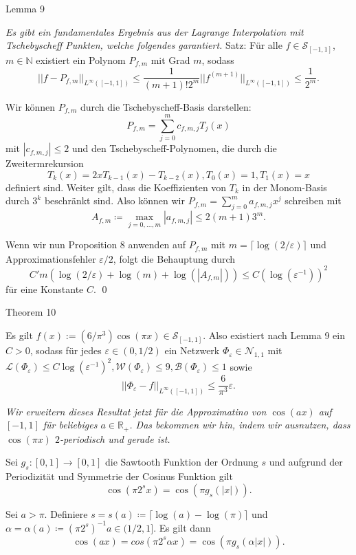 \documentclass[12pt]{article}
\newcommand{\N}{\mathbb{N}} %
\newcommand{\R}{\mathbb{R}} %
\begin{document}
\newpage

{\Large Lemma 9} %

\textit{Es gibt ein fundamentales Ergebnis aus der Lagrange Interpolation mit 
Tschebyscheff Punkten, welche folgendes garantiert.}
Satz: 
Für alle \(f\in \mathcal{S}_{[-1,1]}\), \(m\in\N\) existiert ein Polynom 
\(P_{f,m}\) mit Grad \(m\), sodass 
\[ ||f - P_{f,m}||_{L^\infty ([-1,1])} \leq \frac{1}{(m+1)!2^m} ||f^{(m+1)}||_{L^\infty ([-1,1])} \leq \frac{1}{2^m}. \]

Wir können \(P_{f,m}\) durch die Tschebyscheff-Basis darstellen: 
\[ P_{f,m} = \sum_{j=0}^m c_{f,m,j} T_j(x) \]
mit \(|c_{f,m,j}| \leq 2\) 
und den Tschebyscheff-Polynomen, die durch die Zweitermrekursion 
\[ T_k(x) = 2x T_{k-1}(x) - T_{k-2}(x), T_0(x) = 1, T_1(x) = x \]
definiert sind.
Weiter gilt, dass die Koeffizienten von \(T_k\) in der Monom-Basis 
durch \(3^k\) beschränkt sind. 
Also können wir \(P_{f,m} = \sum_{j=0}^m a_{f,m,j} x^j\) schreiben mit 
\[ A_{f,m} \coloneqq \max_{j=0,\ldots, m} |a_{f,m,j}| \leq 2(m+1)3^m. \] 

Wenn wir nun Proposition 8 anwenden auf \(P_{f,m}\) mit \(m= \lceil \log(2/\varepsilon)\rceil\) 
und Approximationsfehler \(\varepsilon/2\), folgt die Behauptung durch
\[ C' m(\log(2/\varepsilon) + \log(m) + \log(|A_{f,m}|)) \leq C (\log(\varepsilon^{-1}))^2 \]
für eine Konstante \(C\). \qed

\newpage

{\Large Theorem 10} %

Es gilt \(f(x) := (6/\pi^3) \cos(\pi x) \in \mathcal{S}_{[-1,1]}\). Also existiert nach Lemma 9 
ein \(C>0\), sodass für jedes \(\varepsilon \in (0,1/2)\) ein Netzwerk \(\Phi_\varepsilon \in \mathcal{N}_{1,1}\) 
mit \(\mathcal{L}(\Phi_\varepsilon) \leq C \log(\varepsilon^{-1})^2, \mathcal{W}(\Phi_\varepsilon) \leq 9, 
\mathcal{B}(\Phi_\varepsilon) \leq 1\) sowie 
\[ ||\Phi_\varepsilon - f ||_{L^{\infty}([-1,1])} \leq \frac{6}{\pi^3} \varepsilon. \tag{\(*\)} \]

\textit{Wir erweitern dieses Resultat jetzt für die Approximatino von \(\cos(ax)\) auf \([-1,1]\) für beliebiges \(a\in \R_+\). 
Das bekommen wir hin, indem wir ausnutzen, dass \(\cos(\pi x)\) \(2\)-periodisch und gerade ist.}

Sei \(g_s:[0,1] \rightarrow [0,1]\) die Sawtooth Funktion der Ordnung \(s\) und aufgrund der Periodizität und Symmetrie der Cosinus Funktion gilt 
\[ \cos(\pi 2^s x) = \cos(\pi g_s(|x|)). \]

Sei \(a > \pi\). Definiere \(s = s(a) \coloneqq \lceil \log(a) - \log(\pi) \rceil\) und \(\alpha = \alpha(a) \coloneqq (\pi 2^s)^{-1}a \in (1/2, 1]\). 
Es gilt dann 
\[ \cos(ax) = cos(\pi 2^s \alpha x) = \cos(\pi g_s(\alpha |x|)). \]
\end{document}
